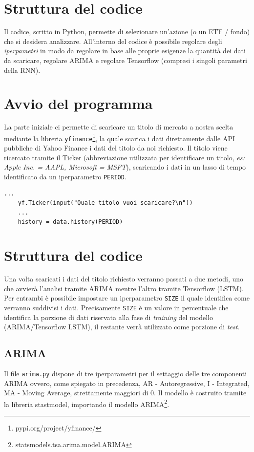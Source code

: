 \documentclass[a4paper,12pt]{article}
\begin{document}
\begin{itemize}
    \end{itemize}

    \section*{Struttura del codice}Il codice, scritto in Python, permette 
    di selezionare un'azione (o un ETF / fondo) che si desidera analizzare.
    All'interno del codice è possibile regolare degli
    \textit{iperpametri} in modo da regolare in base alle proprie esigenze
    la quantità dei dati da scaricare, regolare ARIMA e regolare Tensorflow
    (compresi i singoli parametri della RNN).

    \section{Avvio del programma}La parte iniziale ci permette di scaricare
    un titolo di mercato a nostra scelta mediante la libreria 
    \lstinline|yfinance|\footnote[3]{pypi.org/project/yfinance/}, la quale 
    scarica i dati direttamente dalle API pubbliche di Yahoo Finance i dati
    del titolo da noi richiesto. Il titolo viene ricercato tramite il 
    Ticker (abbreviazione utilizzata per identificare un titolo, 
    \textit{es: Apple Inc. = AAPL, Microsoft = MSFT}), scaricando i dati
    in un lasso di tempo identificato da un iperparametro 
    \lstinline|PERIOD|.
    \begin{lstlisting}[frame=single]
    ...            
    yf.Ticker(input("Quale titolo vuoi scaricare?\n"))
    ...
    history = data.history(PERIOD)
    \end{lstlisting}
    

    \section{Struttura del codice}Una volta scaricati i dati del titolo 
    richiesto verranno passati a due metodi, uno che avvierà l'analisi tramite 
    ARIMA mentre l'altro tramite Tensorflow (LSTM). Per entrambi è possibile 
    impostare un iperparametro \lstinline|SIZE| il quale identifica come 
    verranno suddivisi i dati. Precisamente \lstinline|SIZE| è un valore
    in percentuale che identifica la porzione di dati riservata alla fase
    di \textit{training} del modello (ARIMA/Tensorflow LSTM), il restante
    verrà utilizzato come porzione di \textit{test}.

        \subsection{ARIMA}Il file \lstinline|arima.py| dispone di tre 
        iperparametri per il settaggio delle tre componenti ARIMA ovvero,
        come spiegato in precedenza, AR - Autoregressive, I - Integrated,
        MA - Moving Average, strettamente maggiori di 0. Il modello è 
        costruito tramite la libreria stastmodel, importando il modello 
        ARIMA\footnote[5]{statsmodels.tsa.arima.model.ARIMA}.
\end{document}
